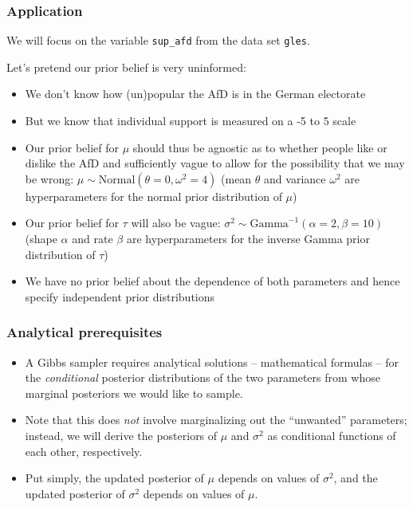 \documentclass[
  11pt,
]{article}
\providecommand{\tightlist}{%
  \setlength{\itemsep}{0pt}\setlength{\parskip}{0pt}}
\begin{document}
\hypertarget{application}{%
\subsubsection{Application}\label{application}}

We will focus on the variable \texttt{sup\_afd} from the data set \texttt{gles}.

Let's pretend our prior belief is very uninformed:

\begin{itemize}
\tightlist
\item
  We don't know how (un)popular the AfD is in the German electorate
\item
  But we know that individual support is measured on a -5 to 5 scale
\item
  Our prior belief for \(\mu\) should thus be agnostic as to whether
  people like or dislike the AfD and sufficiently vague to allow for
  the possibility that we may be wrong:
  \(\mu \sim \text{Normal}(\theta = 0, \omega^{2} = 4)\) (mean \(\theta\)
  and variance \(\omega ^ 2\) are hyperparameters for the normal prior
  distribution of \(\mu\))
\item
  Our prior belief for \(\tau\) will also be vague:
  \(\sigma^2 \sim \text{Gamma}^{-1}(\alpha = 2, \beta = 10)\) (shape
  \(\alpha\) and rate \(\beta\) are hyperparameters for the inverse Gamma
  prior distribution of \(\tau\))
\item
  We have no prior belief about the dependence of both parameters and
  hence specify independent prior distributions
\end{itemize}

\hypertarget{analytical-prerequisites}{%
\subsubsection{Analytical prerequisites}\label{analytical-prerequisites}}

\begin{itemize}
\tightlist
\item
  A Gibbs sampler requires analytical solutions -- mathematical
  formulas -- for the \emph{conditional} posterior distributions of the two
  parameters from whose marginal posteriors we would like to sample.
\item
  Note that this does \emph{not} involve marginalizing out the ``unwanted''
  parameters; instead, we will derive the posteriors of \(\mu\) and
  \(\sigma^2\) as conditional functions of each other, respectively.
\item
  Put simply, the updated posterior of \(\mu\) depends on values of
  \(\sigma ^ 2\), and the updated posterior of \(\sigma ^ 2\) depends on
  values of \(\mu\).
\end{itemize}
\end{document}
